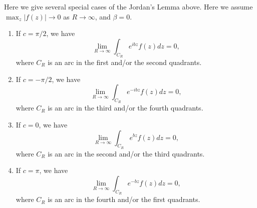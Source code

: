 \begin{remark}
Here we give several special cases of the Jordan's Lemma above. Here we assume
$\max_z |f(z)|\to 0$ as $R\to \infty$, and $\beta=0$.
\begin{enumerate}
\item If $c=\pi/2$, we have
      \[
        \lim_{R\to \infty} \int_{C_R} e^{ibz} f(z) dz = 0,
      \]
      where $C_R$ is an arc in the first and/or the second quadrants.
\item If $c=-\pi/2$, we have
      \[
        \lim_{R\to \infty} \int_{C_R} e^{-ibz} f(z) dz = 0,
      \]
      where $C_R$ is an arc in the third and/or the fourth quadrants.
\item If $c=0$, we have
      \[
        \lim_{R\to \infty} \int_{C_R} e^{bz} f(z) dz = 0,
      \]
      where $C_R$ is an arc in the second and/or the third quadrants.
\item If $c=\pi$, we have
      \[
        \lim_{R\to \infty} \int_{C_R} e^{-bz} f(z) dz = 0,
      \]
      where $C_R$ is an arc in the fourth and/or the first quadrants.
\end{enumerate}
\end{remark}
